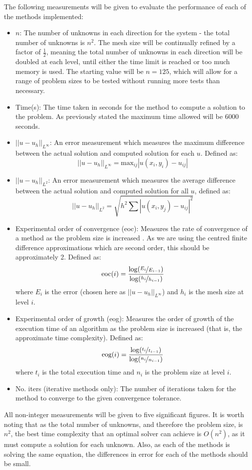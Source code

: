 \documentclass[11pt]{article}
\numberwithin{equation}{section}
\begin{document}
The following measurements will be given to evaluate the performance of each of the methods implemented:
\begin{itemize}
\item $n$: The number of unknowns in each direction for the system - the total number of unknowns is $n^2$. The mesh size will be continually refined by a factor of $\frac{1}{2}$, meaning the total number of unknowns in each direction will be doubled at each level, until either the time limit is reached or too much memory is used. The starting value will be $n=125$, which will allow for a range of problem sizes to be tested without running more tests than necessary.
\item Time(s): The time taken in seconds for the method to compute a solution to the problem. As previously stated the maximum time allowed will be 6000 seconds.
\item $|| u - u_h ||_{L^\infty} $: An error measurement which measures the maximum difference between the actual solution and computed solution for each $u$. Defined as:
 \[ || u - u_h ||_{L^\infty} = \text{max}_{ij} | u(x_i, y_i) - u_{ij} | \]
\item $|| u - u_h ||_{L^2} $: An error measurement which measures the average difference between the actual solution and computed solution for all $u$, defined as:
\[ || u - u_h ||_{L^2} = \sqrt{h^2 \sum | u(x_i,y_j) - u_{ij} |^2} \]
\item Experimental order of convergence (eoc): Measures the rate of convergence of a method as the problem size is increased \cite{Grau}. As we are using the centred finite difference approximations which are second order, this should be approximately 2.  Defined as:
\[ \text{eoc}(i) = \frac{\log(\nicefrac{E_i}{E_{i-1}})}{\log(\nicefrac{h_i}{h_{i-1}})} \]
where $E_i$ is the error (chosen here as $|| u - u_h ||_{L^\infty}$) and $h_i$ is the mesh size at level $i$. 
\item Experimental order of growth (eog): Measures the order of growth of the execution time of an algorithm as the problem size is increased (that is, the approximate time complexity). Defined as:
\[ \text{eog}(i) = \frac{\log(\nicefrac{t_{i}}{t_{i-1}})}{\log(\nicefrac{n_{i}}{n_{i-1}})} \]
where $t_i$ is the total execution time and $n_i$ is the problem size at level $i$.
\item No. iters (iterative methods only): The number of iterations taken for the method to converge to the given convergence tolerance.
\end{itemize}
All non-integer measurements will be given to five significant figures. It is worth noting that as the total number of unknowns, and therefore the problem size, is $n^2$, the best time complexity that an optimal solver can achieve is $O(n^2)$, as it must compute a solution for each unknown. Also, as each of the methods is solving the same equation, the differences in error for each of the methods should be small.
\end{document}
